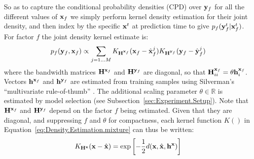 So as to capture the conditional probability densities (CPD) over $\mathbf{y}_f$ for all the different values of $\mathbf{x}_f$ we simply perform kernel density estimation for their joint density, and then  index by the specific $\mathbf{x}^t$ at prediction time to give $p_f(\mathbf{y}_f^t|\mathbf{x}_f^t)$. For factor $f$ the joint density kernel estimate is:
\begin{equation}
p_f(\mathbf{y}_f,\mathbf{x}_f) \propto \mathop{\sum}_{j=1 \ldots M}
K_{\mathbf{H}^{\mathbf{x}_f}}(\mathbf{x}_f - \hat{\mathbf{x}}_f^j)
K_{\mathbf{H}^{\mathbf{y}_f}}(\mathbf{y}_f - \hat{\mathbf{y}}_f^j)
\label{eq:Density.Estimation.mixture}
\end{equation}
\noindent where the bandwidth matrices  $\mathbf{H}^{\mathbf{x}_f} $ and $\mathbf{H}^{\mathbf{y}_f} $ are diagonal, so that $\mathbf{H}^{\mathbf{x}_f}_{ii}  = \theta \mathbf{h}^{\mathbf{x}_f}_i$. Vectors $\mathbf{h}^{\mathbf{x}_f}$ and $\mathbf{h}^{\mathbf{y}_f}$  are estimated from training samples using Silverman's ``multivariate rule-of-thumb'' \citep{scott2004multi-dimensional}. The additional scaling parameter $\theta \in \mathbb{R}$ is estimated by model selection (see Subsection~\ref{sec:Experiment.Setup}). Note that $\mathbf{H}^{\mathbf{x}_f}$ and $\mathbf{H}^{\mathbf{y}_f}$ depend on the factor $f$ being estimated. Given that they are diagonal, and suppressing $f$ and $\theta$ for compactness, each kernel function $K()$ in Equation~\eqref{eq:Density.Estimation.mixture} can thus be written:
\begin{equation}
K_{\mathbf{H}^{\mathbf{x}}}(\mathbf{x} - \hat{\mathbf{x}}) = \exp \left[-\frac{1}{2}d(\mathbf{x}, \hat{\mathbf{x}}, \mathbf{h^{x}}) \right]
\label{eq:Density.Estimation.kernel}
\end{equation}

